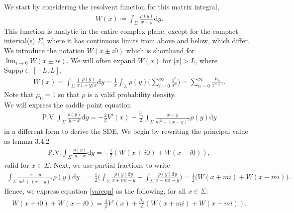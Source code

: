 \documentclass[10pt]{article}
\newcommand{\dif}{\mathrm{d}}
\theoremstyle{plain}
\theoremstyle{definition}
\theoremstyle{plain}
\begin{document}
We start by considering the resolvent function for this matrix integral,
\begin{align*}
	W(x) \coloneqq \int_\Sigma \frac{\rho(y)}{x-y}\dif y. 
\end{align*}
This function is analytic in the entire complex plane, except for the compact interval(s) $\Sigma$, where it has continuous limits from above and below, which differ. We introduce the notation $W(x\pm i0)$ which is shorthand for $\lim_{\epsilon\to 0} W(x\pm i\epsilon)$. We will often expand $W(x)$ for $|x|>L$, where $\text{Supp}{\rho}\subset [-L,L]$,
\begin{align*}
	W(x) = \int_\Sigma \frac{1}{x}\frac{\rho(y)}{1-y/x}\dif y = \frac{1}{x}\int_\Sigma \rho(y)\bigg(\sum_{i=0}^\infty \frac{y^n}{x^n} \bigg)= \sum_{n=0}^\infty \frac{\mu_n}{x^{n+1}}.
\end{align*}
Note that $\mu_0 = 1$ so that $\rho$ is a valid probability density. \\

We will express the saddle point equation 
\begin{align}
	\text{P.V.}\int_\Sigma \frac{\rho(y)}{y-x}\dif y = -\frac{2}{\beta}V'(x)-\frac{\beta_2}{2}\int_\Sigma \frac{x-y}{m^2+(x-y)^2}\rho(y)\dif y \label{vareqn}
\end{align}
in a different form to derive the SDE. We begin by rewriting the principal value as \cite{verhoeven2023geometry} lemma 3.4.2
\begin{align*}
	\text{P.V.}\int_\Sigma \frac{\rho(y)}{y-x}\dif y = -\frac{1}{2}(W(x+i0)+W(x-i0)),
\end{align*}
valid for $x\in\Sigma$. Next, we use partial fractions to write
\begin{align*}
	\int_\Sigma \frac{x-y}{m^2+(x-y)^2}\rho(y)\dif y &= \frac{1}{2}\bigg(\int_\Sigma \frac{\rho(y)\dif y}{x+mi-y}+\int_\Sigma \frac{\rho(y)\dif y}{x-mi - y}\bigg) = \frac{1}{2}\bigg(W(x+mi)+W(x-mi)\bigg).
\end{align*}
 Hence, we express equation \eqref{vareqn} as the following, for all $x\in \Sigma$:
\begin{align}
	W(x+i0)+W(x-i0)=\frac{4}{\beta}V'(x) +\frac{\beta_2}{2}(W(x+mi)+W(x-mi)) \label{saddle}.
\end{align}
\end{document}
